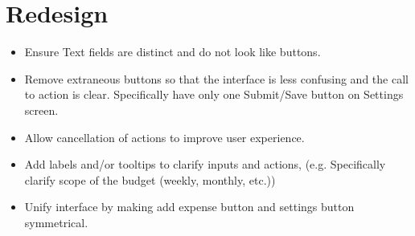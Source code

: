 \documentclass{chi2011}
\begin{document}
\section{Redesign}
    \begin{itemize}
        \item Ensure Text fields are distinct and do not look like buttons.
        \item Remove extraneous buttons so that the interface is less confusing and the call to action is clear.
            Specifically have only one Submit/Save button on Settings screen.
        \item Allow cancellation of actions to improve user experience.
        \item Add labels and/or tooltips to clarify inputs and actions, (e.g. Specifically clarify scope of the budget
            (weekly, monthly, etc.))
        \item Unify interface by making add expense button and settings button symmetrical.
    \end{itemize}
\end{document}
